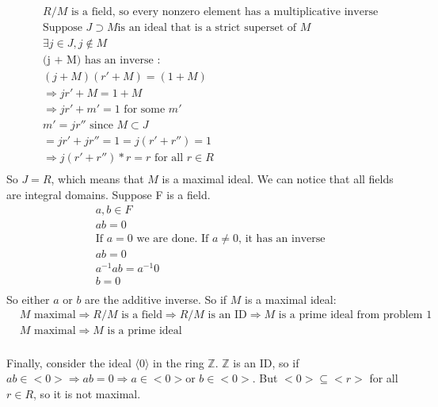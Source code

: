 \documentclass[11pt]{article}
\newcommand{\B}[1]{%
	\mathbb{#1}
}
\begin{document}
{\begin{align*}
&\text{$R/M$ is a field, so every nonzero element has a multiplicative inverse}\\
&\text{Suppose } J \supset M \text{is an ideal that is a strict superset of $M$}\\
&\exists j \in J, j \notin M\\
&\text{(j + M) has an inverse :}\\
&(j + M)(r' + M) = (1 + M)\\
&\Rightarrow jr' + M = 1 + M\\
&\Rightarrow jr' + m' = 1 \text{ for some $m'$}\\
&m' = jr'' \text{ since $M \subset J$}\\
& = jr' + jr'' = 1 = j(r' + r'') = 1\\
&\Rightarrow j(r'+r'')*r = r \text{ for all $r \in R$}\\
\end{align*}
So $J = R$, which means that $M$ is a maximal ideal.
\newline
We can notice that all fields are integral domains. Suppose F is a field.
\begin{align*}
&a, b \in F\\
&ab = 0\\
&\text{If $a = 0$ we are done. If $a \neq 0$, it has an inverse}\\
&ab = 0\\
&a^{-1}ab = a^{-1}0\\
&b = 0\\
\end{align*}
So either $a$ or $b$ are the additive inverse. So if $M$ is a maximal ideal:
\begin{align*}
& M \text{ maximal} \Rightarrow R/M \text{ is a field} \Rightarrow R/M \text{ is an ID} \Rightarrow M \text{ is a prime ideal from problem 1}\\
&M \text{ maximal} \Rightarrow M \text{ is a prime ideal}\\
\end{align*}

Finally, consider the ideal $\langle 0 \rangle$ in the ring $\B{Z}$. $\B{Z}$ is an ID, so if $ab \in <0> \Rightarrow ab = 0 \Rightarrow a \in <0> \text{or } b \in <0>$. But $<0> \subseteq <r>$ for all $r \in R$, so it is not maximal.
}
\end{document}
